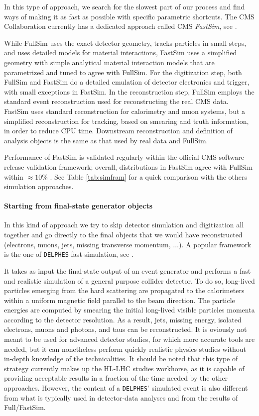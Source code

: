 In this type of approach, we search for the slowest part of our process and find ways of making it as fast as possible with specific parametric shortcuts. The CMS Collaboration currently has a dedicated approach called CMS \emph{FastSim}, see \cite{https://doi.org/10.48550/arxiv.1701.03850}. 

While FullSim uses the exact detector geometry, tracks particles in small steps, and uses
detailed models for material interactions, FastSim uses a simplified geometry with simple analytical material interaction models that are parametrized
and tuned to agree with FullSim. For the digitization step, both FullSim and FastSim do a detailed
emulation of detector electronics and trigger, with small exceptions in FastSim. In the reconstruction step, FullSim employs the standard event reconstruction used for reconstructing the real CMS
data. FastSim uses standard reconstruction for calorimetry and muon systems, but a simplified
reconstruction for tracking, based on smearing and truth information, in order to reduce CPU time. Downstream reconstruction and definition of analysis objects is the same as that used by real data and FullSim.

Performance of FastSim is validated regularly within the official CMS software release validation framework; overall, distributions in FastSim agree with FullSim within $\approx 10\%$ \cite{https://doi.org/10.48550/arxiv.1701.03850}. See Table \ref{tab:simfram} for a quick comparison with the others simulation approaches.

\paragraph{Starting from final-state generator objects}

In this kind of approach we try to skip detector simulation and digitization all together and go directly to the final objects that we would have reconstructed (electrons, muons, jets, missing transverse momentum, $\dots$). A popular framework is the one of \texttt{DELPHES} fast-simulation, see \cite{de_Favereau_2014}.

It takes as input the final-state output of an event generator and performs a fast and realistic simulation of
a general purpose collider detector. To do so, long-lived particles emerging from the hard
scattering are propagated to the calorimeters within a uniform magnetic field parallel to
the beam direction. The particle energies are computed by smearing the initial long-lived
visible particles momenta according to the detector resolution. As a result, jets, missing
energy, isolated electrons, muons and photons, and taus can be reconstructed. It is oviously not meant to
be used for advanced detector studies, for which more accurate tools are needed, but it can nonetheless perform quickly realistic physics studies without in-depth knowledge of the technicalities. It should be noted that this type of strategy currently makes up the HL-LHC studies workhorse, as it is capable of providing acceptable results in a fraction of the time needed by the other approaches. However, the content of a \texttt{DELPHES}' simulated event is also different from what is typically used in detector-data analyses and from the results of Full/FastSim. 


